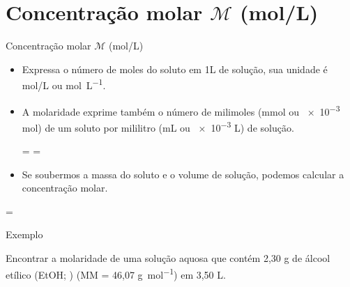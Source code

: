\documentclass[presentation,professionalfonts,aspectratio=169]{beamer}
\begin{document}
\section{Concentração molar \(\mathcal{M}\) (mol/L)}
\label{sec:org0d40de7}

\begin{frame}[label={sec:org17f154e}]{Concentração molar \(\mathcal{M}\) (mol/L)}
\begin{itemize}
\item Expressa o número de moles do soluto em 1L de solução, sua unidade é \alert{mol/L} ou \alert{\unit{\mole\per\liter}}.
\item A molaridade exprime também o número de milimoles (mmol ou \num{e-3} mol) de um soluto por mililitro (mL ou \num{e-3} L) de solução.

\begin{tcolorbox}
= \Longrightarrow {}=
\end{tcolorbox}

\item Se soubermos a massa do soluto e o volume de solução, podemos calcular a concentração molar.
\end{itemize}

\begin{tcolorbox}
=
\end{tcolorbox}
\end{frame}

\begin{frame}[label={sec:org5fb6eea}]{Exemplo}
\begin{question}
Encontrar a molaridade de uma solução aquosa que contém 2,30 g de álcool
etílico (EtOH; ) (MM = 46,07 \unit{\gram\per\mole}) em 3,50 L.
\end{question}

\end{frame}
\end{document}
